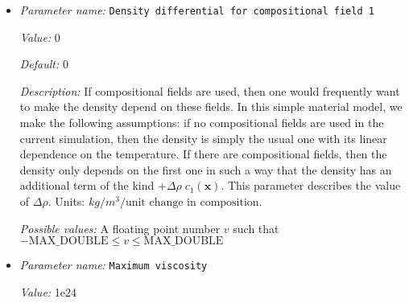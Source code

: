 \begin{itemize}
{\it Value:} true


{\it Default:} true


{\it Description:} Whether to list phase transitions by depth or pressure. If this parameter is true, then the input file will use Phase transitions depths and Phase transition widths to define the phase transition. If it is false, the parameter file will read in phase transition data from Phase transition pressures and Phase transition pressure widths.


{\it Possible values:} A boolean value (true or false)
\item {\it Parameter name:} {\tt Density differential for compositional field 1}
\label{parameters:Material model/Latent heat/Density differential for compositional field 1}
\label{parameters:Material_20model/Latent_20heat/Density_20differential_20for_20compositional_20field_201}


{\it Value:} 0


{\it Default:} 0


{\it Description:} If compositional fields are used, then one would frequently want to make the density depend on these fields. In this simple material model, we make the following assumptions: if no compositional fields are used in the current simulation, then the density is simply the usual one with its linear dependence on the temperature. If there are compositional fields, then the density only depends on the first one in such a way that the density has an additional term of the kind $+\Delta \rho \; c_1(\mathbf x)$. This parameter describes the value of $\Delta \rho$. Units: $kg/m^3/\textrm{unit change in composition}$.


{\it Possible values:} A floating point number $v$ such that $-\text{MAX\_DOUBLE} \leq v \leq \text{MAX\_DOUBLE}$
\item {\it Parameter name:} {\tt Maximum viscosity}
\label{parameters:Material model/Latent heat/Maximum viscosity}
\label{parameters:Material_20model/Latent_20heat/Maximum_20viscosity}


{\it Value:} 1e24



\end{itemize}
